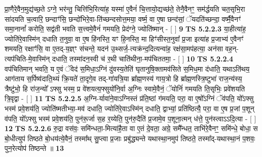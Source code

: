 \documentclass[17pt]{extarticle}
\begin{document}
                  प्रा॒णैरे॒वैन॒मुद्य॑च्छ॒ते ऽग्ने॒ भर॑न्तु॒ चित्ति॑भि॒रित्या॑ह॒ यस्मा॑ ए॒वैनं॑ चि॒त्तायो॒द्यच्छ॑ते॒ तेनै॒वैनꣳ॒॒ सम॑र्द्धयति चत॒सृभि॒रा सा॑दयति च॒त्वारि॒ छन्दाꣳ॑सि॒ छन्दो॑भिरे॒वा-ति॑च्छन्दसोत्त॒मया॒ वर्ष्म॒ वा ए॒षा छन्द॑सां॒ ॅयदति॑च्छन्दा॒ वर्ष्मै॒वैनꣳ॑ समा॒नानां᳚ करोति॒ सद्व॑ती भवति स॒त्त्वमे॒वैनं॑ गमयति॒ प्रेद॑ग्ने॒ ज्योति॑ष्मान् - [  ] \textbf{  9} \newline
                  \newline
                                \textbf{ TS 5.2.2.3} \newline
                  या॒हीत्या॑ह॒ ज्योति॑रे॒वास्मि॑न् दधाति त॒नुवा॒ वा ए॒ष हि॑नस्ति॒ यꣳ हि॒नस्ति॒ मा हिꣳ॑सीस्त॒नुवा᳚ प्र॒जा इत्या॑ह प्र॒जाभ्य॑ ए॒वैनꣳ॑ शमयति॒ रक्षाꣳ॑सि॒ वा ए॒तद्-य॒ज्ञ्ꣳ स॑चन्ते॒ यदन॑ उ॒थ्सर्ज॒-त्यक्र॑न्द॒दित्यन्वा॑ह॒ रक्ष॑सा॒मप॑हत्या॒ अन॑सा वह॒न्-त्यप॑चिति-मे॒वास्मि॑न् दधाति॒ तस्मा॑दन॒स्वी च॑ र॒थी चाति॑थीना॒-मप॑चिततमा॒ - [  ] \textbf{  10} \newline
                  \newline
                                \textbf{ TS 5.2.2.4} \newline
                  वप॑चितिमान् भवति॒ य ए॒वं ॅवेद॑ स॒मिधा॒ऽग्निं दु॑वस्य॒तेति॑ घृतानुषि॒क्तामव॑सिते स॒मिध॒मा द॑धाति॒ यथाऽति॑थय॒ आग॑ताय स॒र्पिष्व॑दाति॒थ्यं क्रि॒यते॑ ता॒दृगे॒व तद्-गा॑यत्रि॒या ब्रा᳚ह्म॒णस्य॑ गाय॒त्रो हि ब्रा᳚ह्म॒णस्त्रि॒ष्टुभा॑ राज॒न्य॑स्य॒ त्रैष्टु॑भो॒ हि रा॑ज॒न्यो᳚ ऽफ्सु भस्म॒ प्र वे॑शयत्य॒फ्सुयो॑नि॒र्वा अ॒ग्निः स्वामे॒वैनं॒ ॅयोनिं॑ गमयति ति॒सृभिः॒ प्रवे॑शयति त्रि॒वृद्वा - [  ] \textbf{  11} \newline
                  \newline
                                \textbf{ TS 5.2.2.5} \newline
                  अ॒ग्नि-र्यावा॑ने॒वाऽग्निस्तं प्र॑ति॒ष्ठां ग॑मयति॒ परा॒ वा ए॒षो᳚ऽग्निं ॅव॑पति॒ यो᳚ऽफ्सु भस्म॑ प्रवे॒शय॑ति॒ ज्योति॑ष्मतीभ्या॒-मव॑ दधाति॒ ज्योति॑रे॒वाऽस्मि॑न् दधाति॒ द्वाभ्यां॒ प्रति॑ष्ठित्यै॒ परा॒ वा ए॒ष प्र॒जां प॒शून् व॑पति॒ यो᳚ऽफ्सु भस्म॑ प्रवे॒शय॑ति॒ पुन॑रू॒र्जा स॒ह र॒य्येति॒ पुन॑रु॒दैति॑ प्र॒जामे॒व प॒शूना॒त्मन् ध॑त्ते॒ पुन॑स्त्वाऽऽदि॒त्या - [  ] \textbf{  12} \newline
                  \newline
                                \textbf{ TS 5.2.2.6} \newline
                  रु॒द्रा वस॑वः॒ समि॑न्धता॒-मित्या॑है॒ता वा ए॒तं दे॒वता॒ अग्रे॒ समै᳚न्धत॒ ताभि॑रे॒वैनꣳ॒॒ समि॑न्धे॒ बोधा॒ स बो॒धीत्युप॑ तिष्ठते बो॒धय॑त्ये॒वैनं॒ तस्मा᳚थ् सु॒प्त्वा प्र॒जाः प्रबु॑द्ध्यन्ते यथास्था॒नमुप॑ तिष्ठते॒ तस्मा᳚द्-यथास्था॒नं प॒शवः॒ पुन॒रेत्योप॑ तिष्ठन्ते ॥ \textbf{  13} \newline
\end{document}
